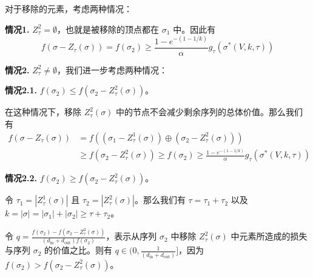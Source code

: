 对于移除的元素，考虑两种情况：

\textbf{情况1.} $Z^2_{\tau}=\emptyset$，也就是被移除的顶点都在 $\sigma_1$ 中。因此有
\begin{equation}
    f(\sigma-Z_\tau(\sigma))=f(\sigma_2) \ge \frac{1-e^{-(1-1/k)}}{\alpha} g_\tau(\sigma^*(V,k,\tau))
\end{equation}

\textbf{情况2.} $Z^2_{\tau} \neq \emptyset$，我们进一步考虑两种情况：

\textbf{情况2.1.} $f(\sigma_2) \le f(\sigma_2 - Z^2_\tau(\sigma))$。

在这种情况下，移除 $Z^2_\tau(\sigma)$ 中的节点不会减少剩余序列的总体价值。那么我们有
\begin{align}
f(\sigma-Z_\tau(\sigma)) & = f((\sigma_1 - Z_\tau^1(\sigma)) \oplus (\sigma_2 - Z_\tau^2(\sigma))) \\
& \ge f(\sigma_2 -Z_\tau^2(\sigma)) \ge f(\sigma_2) \ge \frac{1-e^{-(1-1/k)}}{\alpha} g_\tau(\sigma^*(V,k,\tau))
\end{align}

\textbf{情况2.2.}  $f(\sigma_2) \ge f(\sigma_2 - Z^2_\tau(\sigma))$。

令 $\tau_1 = |Z_\tau^1(\sigma)|$ 且 $\tau_2=|Z_\tau^2(\sigma)|$。那么我们有 $\tau=\tau_1+\tau_2$ 以及 $k=|\sigma|=|\sigma_1|+|\sigma_2|\ge \tau+\tau_2$。

令 $q= \frac{f(\sigma_2)-f(\sigma_2-Z_\tau^2(\sigma))}{(d_{\text{in}}+d_{\text{out}})f(\sigma_2)}$，表示从序列 $\sigma_2$ 中移除 $Z_\tau^2(\sigma)$ 中元素所造成的损失与序列 $\sigma_2$ 的价值之比。则有 $q\in (0,\frac{1}{(d_{\text{in}}+d_{\text{out}})}]$，因为 $f(\sigma_2) > f(\sigma_2-Z_\tau^2(\sigma))$。

